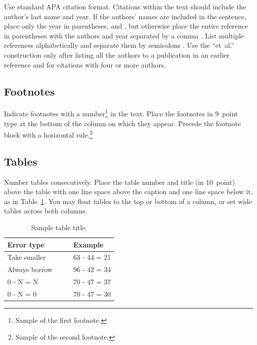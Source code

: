 \documentclass[10pt,letterpaper]{article}
\begin{document}
Use standard APA citation format. Citations within the text should
include the author's last name and year. If the authors' names are
included in the sentence, place only the year in parentheses, and
, but otherwise place the entire reference in
parentheses with the authors and year separated by a comma
\cite{NewellSimon1972a}. List multiple references alphabetically and
separate them by semicolons
\cite{ChalnickBillman1988a,NewellSimon1972a}. Use the
``et~al.'' construction only after listing all the authors to a
publication in an earlier reference and for citations with four or
more authors.


\subsection{Footnotes}

Indicate footnotes with a number\footnote{Sample of the first
footnote.} in the text. Place the footnotes in 9~point type at the
bottom of the column on which they appear. Precede the footnote block
with a horizontal rule.\footnote{Sample of the second footnote.}


\subsection{Tables}

Number tables consecutively. Place the table number and title (in
10~point) above the table with one line space above the caption and
one line space below it, as in Table~\ref{sample-table}. You may float
tables to the top or bottom of a column, or set wide tables across
both columns.

\begin{table}[!ht]
\begin{center} 
\caption{Sample table title.} 
\label{sample-table} 
\vskip 0.12in
\begin{tabular}{ll} 
\hline
Error type    &  Example \\
\hline
Take smaller        &   63 - 44 = 21 \\
Always borrow~~~~   &   96 - 42 = 34 \\
0 - N = N           &   70 - 47 = 37 \\
0 - N = 0           &   70 - 47 = 30 \\
\hline
\end{tabular} 
\end{center} 
\end{table}
\end{document}
